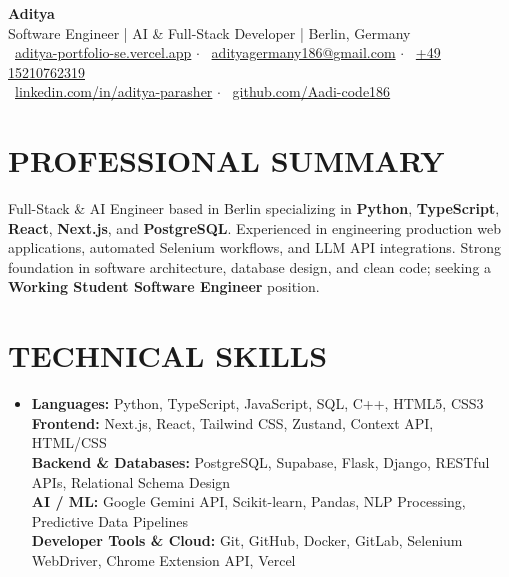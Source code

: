 \documentclass[a4paper,10pt]{article}
\begin{document}
\begin{center}
    \vspace{-8pt}
    {\Huge \bfseries \color{primary} Aditya} \\[3pt]
    \small \color{accent} Software Engineer \quad | \quad AI \& Full-Stack Developer \quad | \quad Berlin, Germany \\[3pt]
    \small 
    \faGlobe\ \href{https://aditya-portfolio-se.vercel.app/}{aditya-portfolio-se.vercel.app} \quad $\cdot$ \quad
    \faEnvelope\ \href{mailto:adityagermany186@gmail.com}{adityagermany186@gmail.com} \quad $\cdot$ \quad
    \faPhone\ \href{tel:+4915210762319}{+49 15210762319} \\[2pt]
    \small
    \faLinkedin\ \href{https://www.linkedin.com/in/aditya-parasher/}{linkedin.com/in/aditya-parasher} \quad $\cdot$ \quad
    \faGithub\ \href{https://github.com/Aadi-code186}{github.com/Aadi-code186}
    \vspace{-6pt}
\end{center}

\section*{PROFESSIONAL SUMMARY}
\small{
Full-Stack \& AI Engineer based in Berlin specializing in \textbf{Python}, \textbf{TypeScript}, \textbf{React}, \textbf{Next.js}, and \textbf{PostgreSQL}. Experienced in engineering production web applications, automated Selenium workflows, and LLM API integrations. Strong foundation in software architecture, database design, and clean code; seeking a \textbf{Working Student Software Engineer} position.
}

\section*{TECHNICAL SKILLS}
\begin{itemize}[leftmargin=0.15in, label={}]
  \item \small{
    \textbf{Languages:} Python, TypeScript, JavaScript, SQL, C++, HTML5, CSS3 \\
    \textbf{Frontend:} Next.js, React, Tailwind CSS, Zustand, Context API, HTML/CSS \\
    \textbf{Backend \& Databases:} PostgreSQL, Supabase, Flask, Django, RESTful APIs, Relational Schema Design \\
    \textbf{AI / ML:} Google Gemini API, Scikit-learn, Pandas, NLP Processing, Predictive Data Pipelines \\
    \textbf{Developer Tools \& Cloud:} Git, GitHub, Docker, GitLab, Selenium WebDriver, Chrome Extension API, Vercel
  }
\end{itemize}
\end{document}
